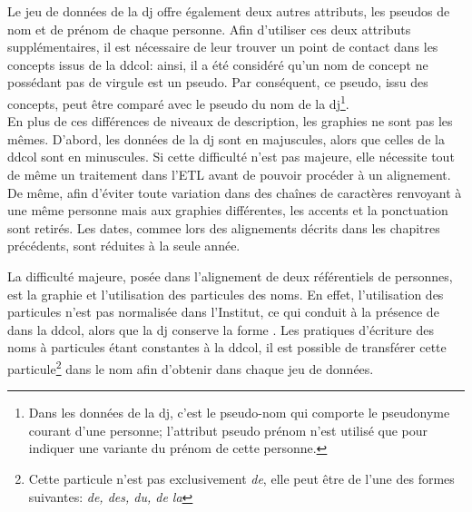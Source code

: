 \noindent Le jeu de données de la \ac{dj} offre également deux autres attributs, les pseudos de nom et de prénom de chaque personne. Afin d'utiliser ces deux attributs supplémentaires, il est nécessaire de leur trouver un point de contact dans les concepts issus de la \ac{ddcol}: ainsi, il a été considéré qu'un nom de concept ne possédant pas de virgule est un pseudo. Par conséquent, ce pseudo, issu des concepts, peut être comparé avec le pseudo du nom de la \ac{dj}\footnote{Dans les données de la \ac{dj}, c'est le pseudo-nom qui comporte le pseudonyme courant d'une personne; l'attribut pseudo prénom n'est utilisé que pour indiquer une variante du prénom de cette personne.}.\\

En plus de ces différences de niveaux de description, les graphies ne sont pas les mêmes. D'abord, les données de la \ac{dj} sont en majuscules, alors que celles de la \ac{ddcol} sont en minuscules. Si cette difficulté n'est pas majeure, elle nécessite tout de même un traitement dans l'ETL avant de pouvoir procéder à un alignement. De même, afin d'éviter toute variation dans des chaînes de caractères renvoyant à une même personne mais aux graphies différentes, les accents et la ponctuation sont retirés. Les dates, commee lors des alignements décrits dans les chapitres précédents, sont réduites à la seule année.

\noindent La difficulté majeure, posée dans l'alignement de deux référentiels de personnes, est la graphie et l'utilisation des particules des noms. En effet, l'utilisation des particules n'est pas normalisée dans l'Institut, ce qui conduit à la présence de  dans la \ac{ddcol}, alors que la \ac{dj} conserve la forme . Les pratiques d'écriture des noms à particules étant constantes à la \ac{ddcol}, il est possible de transférer cette particule\footnote{Cette particule n'est pas exclusivement \textit{de}, elle peut être de l'une des formes suivantes: \textit{de, des, du, de la}} dans le nom afin d'obtenir   dans chaque jeu de données.\\

